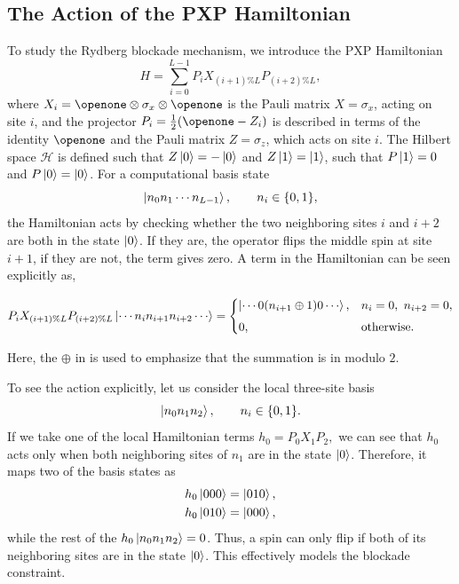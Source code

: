 \documentclass[%
 reprint,
 amsmath,amssymb,
 aps,
]{revtex4-2}
\begin{document}
\subsection{The Action of the PXP Hamiltonian}
To study the Rydberg blockade mechanism, we introduce the PXP Hamiltonian
\begin{equation}
H = \sum_{i=0}^{L-1} P_i X_{(i+1)\% L} P_{(i+2)\% L},
\end{equation}
where $X_i = \openone \otimes \sigma_x \otimes \openone$ is the Pauli matrix $X = \sigma_x$, acting on site $i$, and the projector $P_i = \frac{1}{2}(\openone - Z_i)$ is described in terms of the identity $\openone$ and the Pauli matrix $Z = \sigma_z$, which acts on site $i$. The Hilbert space $\mathcal{H}$ is defined such that $Z\ket{0} = -\ket{0}$ and $Z\ket{1} = \ket{1}$, such that $P\ket{1} = 0$ and $P\ket{0} = \ket{0}$.
For a computational basis state
\[
\ket{n_0n_1\cdots n_{L-1}},
\qquad n_i \in \{0,1\},
\]
the Hamiltonian acts by checking whether the two neighboring sites $i$ and $i+2$ are both in the state $\ket{0}$. If they are, the operator flips the middle spin at site $i+1$, if they are not, the term gives zero.
A term in the Hamiltonian can be seen explicitly as,
\begin{widetext}
\begin{equation}
\label{eq:explicitPXP}
P_i X_{(i+1)\%L} P_{(i+2)\%L}
\ket{\cdots n_in_{i+1}n_{i+2}\cdots}
=
\begin{cases}
\ket{\cdots 0(n_{i+1}\oplus 1)0\cdots},
& n_i=0,\ n_{i+2}=0,\\[4pt]
0,
& \text{otherwise}.
\end{cases}
\end{equation}
\end{widetext}
Here, the $\oplus$ in  is used to emphasize that the summation is in modulo $2$. 

To see the action explicitly, let us consider the local three-site basis
\[
\ket{n_0n_{1}n_{2}},
\qquad n_i \in \{0,1\}.
\]
If we take one of the local Hamiltonian terms $h_0 = P_0 X_{1} P_{2},$ we can see that $h_0$ acts only when both neighboring sites of $n_1$ are in the state $\ket{0}$. Therefore, it maps two of the basis states as
\begin{equation*}
    \begin{aligned}
        h_0\ket{000} &= \ket{010},\\
        h_0\ket{010} &= \ket{000},\\
    \end{aligned}
\end{equation*}
while the rest of the $h_0\ket{n_0n_1n_2} = 0$. Thus, a spin can only flip if both of its neighboring sites are in the state
$\ket{0}$. This effectively models the blockade constraint.
\end{document}
